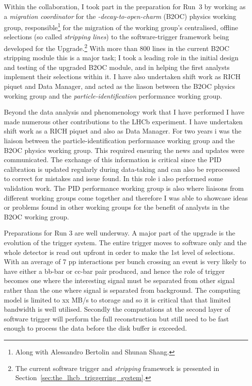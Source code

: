 Within the \lhcb collaboration, I took part in the preparation for Run~3 by working as a \emph{migration coordinator} for the \emph{\B-decay-to-open-charm} (B2OC) physics working group, responsible\footnote{Along with Alessandro Bertolin and Shunan Shang.} for the migration of the working group's centralised, offline selections (so called \emph{stripping lines}) to the software-trigger framework being developed for the \lhcb Upgrade.\footnote{The current software trigger and \emph{stripping} framework is presented in Section~\ref{sec:the_lhcb_triggerring_system}.} With more than 800 lines in the current B2OC stripping module this is a major task; I took a leading role in the initial design and testing of the upgraded B2OC module, and in helping the first analysts implement their selections within it. I have also undertaken shift work as RICH piquet and Data Manager, and acted as the liason between the B2OC physics working group and the \emph{particle-identification} performance working group.

Beyond the data analysis and phenomenology work that I have performed I have made numerous other contributions to the LHCb experiment. I have undertaken shift work as a RICH piquet and also as Data Manager. For two years i was the liaison between the particle-identification performance working group and the B2OC physics working group. This required ensuring the news and updates were communicated. The exchange of this information is critical since the PID calibration is updated regularly during data-taking and can also be reprocessed to correct for mistakes and issue found. In this role i also performed some validation work. The PID performance working group is also where liaisons from different working groups come together and therefore I was able to showcase ideas or problems found in other working groups for the benefit of analysts in the B2OC working group. 

Preparations for Run 3 are well underway. A major part of the upgrade is the evolution of the trigger system. The entire trigger moves to software only and the whole detector is read out upfront in order to make the 1st level of selections. With an average of 7 pp interactions per bunch crossing an event is very likely to have either a bb-bar or cc-bar pair produced, and hence the role of trigger becomes one where the interesting signal must be separated from other signal rather than the one where signal is separated from background. The computing model is limited to xx MB/s to storage and so it is critical that that limited bandwidth is well utilised. Secondly the computations at the second layer of software trigger will perform the full reconstruction but still need to be fast enough to process the data before the disk buffer is exceeded. 

